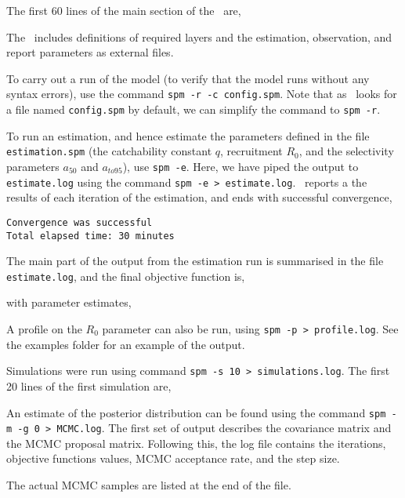 The first 60 lines of the main section of the \config\ are,
 

The \config\ includes definitions of required layers and the estimation, observation, and report parameters as external files.

To carry out a run of the model (to verify that the model runs without any syntax errors), use the command \texttt{spm -r -c config.spm}. Note that as \SPM\ looks for a file named \texttt{config.spm} by default, we can simplify the command to \texttt{spm -r}. 

To run an estimation, and hence estimate the parameters defined in the file \texttt{estimation.spm} (the catchability constant $q$, recruitment $R_0$, and the selectivity parameters $a_{50}$ and $a_{to95}$), use \texttt{spm -e}. Here, we have piped the output to \texttt{estimate.log} using the command \texttt{spm -e > estimate.log}.  \SPM\ reports a the results of each iteration of the estimation, and ends with successful convergence,
{\small{\begin{verbatim}
Convergence was successful
Total elapsed time: 30 minutes
\end{verbatim}}}

The main part of the output from the estimation run is summarised in the file \texttt{estimate.log}, and the final objective function is,
 
with parameter estimates,
 

A profile on the $R_0$ parameter can also be run, using \texttt{spm -p > profile.log}. See the examples folder for an example of the output.

Simulations were run using command \texttt{spm -s 10 > simulations.log}. The first 20 lines of the first simulation are,
 

An estimate of the posterior distribution can be found using the command \texttt{spm -m -g 0 > MCMC.log}. The first set of output describes the covariance matrix and the MCMC proposal matrix. Following this, the log file contains the iterations, objective functions values, MCMC acceptance rate, and the step size.

The actual MCMC samples are listed at the end of the file.


